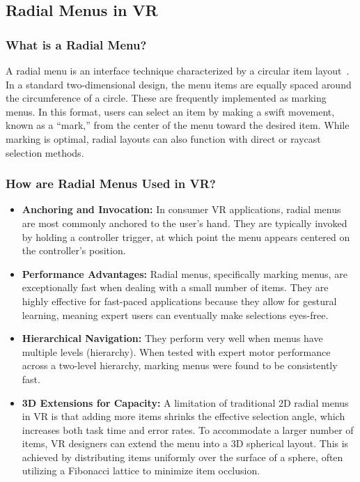 \documentclass[inscr,ack,preface]{dithesis}
\begin{document}
\subsection{Radial Menus in VR}

\subsubsection{What is a Radial Menu?}
A radial menu is an interface technique characterized by a circular item layout~\cite{Wentzel}.
In a standard two-dimensional design, the menu items are equally spaced around the circumference of a circle.
These are frequently implemented as marking menus. In this format,
users can select an item by making a swift movement, known as a ``mark,''
from the center of the menu toward the desired item. While marking is optimal, radial layouts can also function with direct or raycast selection methods.

\subsubsection{How are Radial Menus Used in VR?}
\begin{itemize}
  \item \textbf{Anchoring and Invocation:} In consumer VR applications, radial menus are most commonly anchored to the user's hand.
        They are typically invoked by holding a controller trigger, at which point the menu appears centered on the controller's position.
  \item \textbf{Performance Advantages:} Radial menus, specifically marking menus, are exceptionally fast when dealing with a small number of items.
        They are highly effective for fast-paced applications because they allow for gestural learning, meaning expert users can eventually make selections eyes-free.
  \item \textbf{Hierarchical Navigation:} They perform very well when menus have multiple levels (hierarchy).
        When tested with expert motor performance across a two-level hierarchy, marking menus were found to be consistently fast.
  \item \textbf{3D Extensions for Capacity:} A limitation of traditional 2D radial menus in VR is that adding more items shrinks the effective selection angle,
        which increases both task time and error rates. To accommodate a larger number of items, VR designers can extend the menu into a 3D spherical layout.
        This is achieved by distributing items uniformly over the surface of a sphere, often utilizing a Fibonacci lattice to minimize item occlusion.
\end{itemize}
\end{document}
